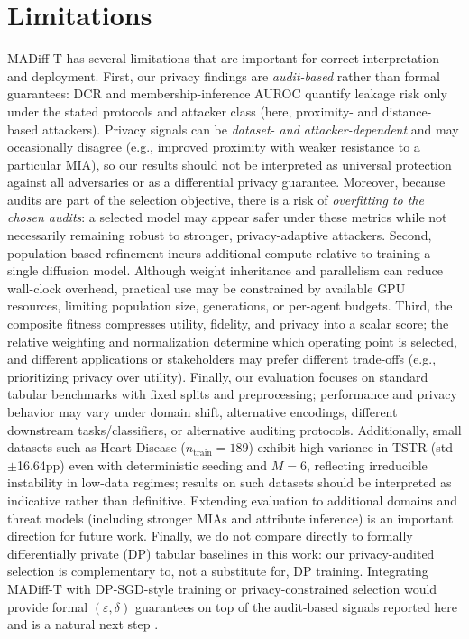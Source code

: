 \documentclass[preprint,12pt]{elsarticle}
\begin{document}
\section{Limitations}
MADiff-T has several limitations that are important for correct interpretation and deployment. First, our privacy findings are \emph{audit-based} rather than formal guarantees: DCR and membership-inference AUROC quantify leakage risk only under the stated protocols and attacker class (here, proximity- and distance-based attackers). Privacy signals can be \emph{dataset- and attacker-dependent} and may occasionally disagree (e.g., improved proximity with weaker resistance to a particular MIA), so our results should not be interpreted as universal protection against all adversaries or as a differential privacy guarantee. Moreover, because audits are part of the selection objective, there is a risk of \emph{overfitting to the chosen audits}: a selected model may appear safer under these metrics while not necessarily remaining robust to stronger, privacy-adaptive attackers. Second, population-based refinement incurs additional compute relative to training a single diffusion model. Although weight inheritance and parallelism can reduce wall-clock overhead, practical use may be constrained by available GPU resources, limiting population size, generations, or per-agent budgets. Third, the composite fitness compresses utility, fidelity, and privacy into a scalar score; the relative weighting and normalization determine which operating point is selected, and different applications or stakeholders may prefer different trade-offs (e.g., prioritizing privacy over utility). Finally, our evaluation focuses on standard tabular benchmarks with fixed splits and preprocessing; performance and privacy behavior may vary under domain shift, alternative encodings, different downstream tasks/classifiers, or alternative auditing protocols. 
Additionally, small datasets such as Heart Disease 
($n_{\text{train}}=189$) exhibit high variance in TSTR
(std $\pm$16.64pp) even with deterministic seeding and 
$M=6$, reflecting irreducible instability in low-data 
regimes; results on such datasets should be interpreted 
as indicative rather than definitive. Extending evaluation to additional domains and threat models (including stronger MIAs and attribute inference) is an important direction for future work. Finally, we do not compare directly to formally differentially private (DP) tabular baselines in this work: our privacy-audited selection is complementary to, not a substitute for, DP training. Integrating MADiff-T with DP-SGD-style training or privacy-constrained selection would provide formal $(\varepsilon,\delta)$ guarantees on top of the audit-based signals reported here and is a natural next step \cite{chen2025benchmarking_dp_tabular_synthesis}.
\end{document}
